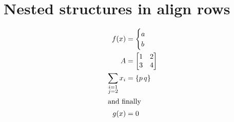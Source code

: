 \section{Nested structures in align rows}

\begin{align}
f(x) &= \begin{cases} a \\ b \end{cases} \label{eq:cases}\\
A &= \begin{bmatrix} 1 & 2 \\ 3 & 4 \end{bmatrix} \label{eq:matrix}\\
\sum_{\substack{i=1 \\ j=2}} x_i &= \{p\,q\}\, \label{eq:substack}\\
\intertext{and finally}
g(x) &= 0 \label{eq:last}
\end{align}
